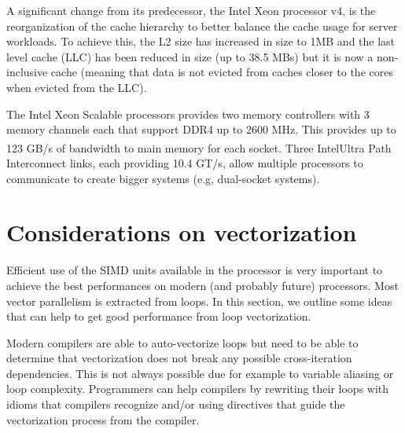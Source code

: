 \documentclass[9pt,comparison]{livecoms}
\newcommand{\rr}{\textsuperscript{\textregistered}}
\begin{document}
A significant change from its predecessor, the Intel Xeon processor v4, is the reorganization of the cache hierarchy to better balance the cache usage for server workloads. To achieve this, the L2 size has increased in size to 1MB and the last level cache (LLC) has been reduced in size (up to 38.5 MBs) but it is now a non-inclusive cache (meaning that data is not evicted from caches closer to the cores when evicted from the LLC).

The Intel Xeon Scalable processors provides two memory controllers with 3 memory channels each that support DDR4 up to 2600 MHz. This provides up to 123 GB/s of bandwidth to main memory for each socket. Three Intel\rr Ultra Path Interconnect links, each providing 10.4 GT/s, allow  multiple processors to communicate to create bigger systems (e.g, dual-socket systems).

\section{Considerations on vectorization}
\label{subsection:Considerations_vecto}
\hspace{\parindent}Efficient use of the SIMD units available in the processor is very important to achieve the best performances on modern (and probably future) processors. Most vector parallelism is extracted from loops. In this section, we outline some ideas that can help to get good performance from loop vectorization. 

Modern compilers are able to auto-vectorize loops but need to be able to determine that vectorization does not break any possible cross-iteration dependencies. This is not always possible due for example to variable aliasing or loop complexity\cite{vector-compiler}. Programmers can help compilers by rewriting their loops with idioms that compilers recognize and/or using directives that guide the vectorization process from the compiler.
\end{document}
